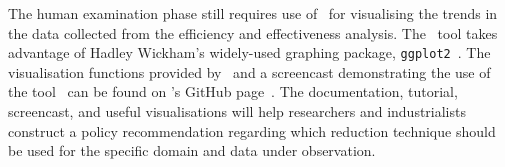 
The human examination phase still requires use of \mr~for visualising the trends in the data collected from the efficiency
and effectiveness analysis. The \mr~tool takes advantage of Hadley Wickham's widely-used graphing package,
\texttt{ggplot2}~\cite{ggplot2}. The visualisation functions provided by \mr~and a screencast demonstrating the use of
the tool~\cite{asciinema} can be found on \mr's GitHub page~\cite{tool}. The documentation, tutorial, screencast, and
useful visualisations will help researchers and industrialists construct a policy recommendation regarding which
reduction technique should be used for the specific domain and data under observation.


